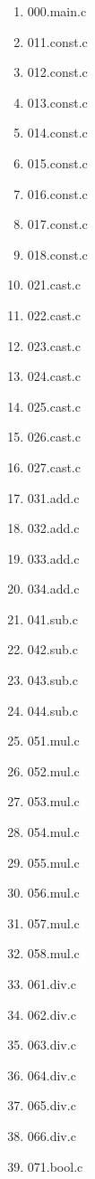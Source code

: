 \begin{multicols}{5}
    \begin{enumerate}
        \item 000.main.c
        \item 011.const.c
        \item 012.const.c
        \item 013.const.c
        \item 014.const.c
        \item 015.const.c
        \item 016.const.c
        \item 017.const.c
        \item 018.const.c
        \item 021.cast.c
        \item 022.cast.c
        \item 023.cast.c
        \item 024.cast.c
        \item 025.cast.c
        \item 026.cast.c
        \item 027.cast.c
        \item 031.add.c
        \item 032.add.c
        \item 033.add.c
        \item 034.add.c
        \item 041.sub.c
        \item 042.sub.c
        \item 043.sub.c
        \item 044.sub.c
        \item 051.mul.c
        \item 052.mul.c
        \item 053.mul.c
        \item 054.mul.c
        \item 055.mul.c
        \item 056.mul.c
        \item 057.mul.c
        \item 058.mul.c
        \item 061.div.c
        \item 062.div.c
        \item 063.div.c
        \item 064.div.c
        \item 065.div.c
        \item 066.div.c
        \item 071.bool.c

\end{enumerate}
\end{multicols}
